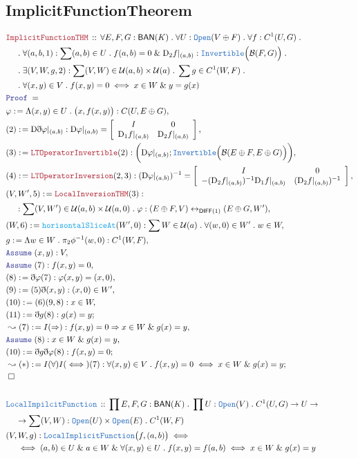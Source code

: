 \documentclass[12pt]{scrartcl}
\newcommand{\TYPE}[1]{\textcolor{NavyBlue}{\mathtt{#1}}}
\newcommand{\FUNC}[1]{\textcolor{Cerulean}{\mathtt{#1}}}
\newcommand{\LOGIC}[1]{\textcolor{Blue}{\mathtt{#1}}}
\newcommand{\THM}[1]{\textcolor{Maroon}{\mathtt{#1}}}
\renewcommand{\.}{\; . \;}
\newcommand{\de}{: \kern 0.1pc =}
\newcommand{\Theorem}[2]{& \THM{#1} \, :: \, #2 \\ & \Proof = \\ }
\newcommand{\DeclareType}[2]{& \TYPE{#1} \, :: \, #2 \\}
\newcommand{\NewLine}{\\ & \kern 1pc}
\newcommand{\Page}[1]{\begin{align*} #1 \end{align*}   }
\newcommand{ \bd }{ \ByDef }
\renewcommand{\And}{\; \& \;}
\newcommand{\ToBij}{\leftrightarrow}
\newcommand{\Say}[3]{& #1 \de #2 : #3, \\}
\newcommand{\Conclude}[3]{& #1 \de #2 : #3; \\}
\newcommand{\Derive}[3]{& \leadsto #1 \de #2 : #3, \\}
\newcommand{\DeriveConclude}[3]{& \leadsto #1 \de #2 : #3 ; \\}
\newcommand{\A}{\LOGIC{Assume} \;}
\newcommand{\Assume}[2]{& \A #1 : #2, \\}
\newcommand{\QED}{\; \square}
\newcommand{\EndProof}{& \QED \\}
\newcommand{\ByDef}{\eth}
\newcommand{\Proof}{\LOGIC{Proof} \; }
\newcommand{\DIFF}{\mathsf{DIFF}}
\newcommand{\BAN}{\mathsf{BAN}} %
\newcommand{\D}{\mathrm{D}}
\newcommand{\B}{\mathcal{B}}
\begin{document}
\subsection{ImplicitFunctionTheorem}
\Page{
	\Theorem{ImplicitFunctionTHM}{ 
		\forall E,F,G : \BAN(K) \.  \forall  U : \TYPE{Open}(V \oplus F) \. \forall f : C^1(U,G) \.
		\NewLine \.
		\forall (a,b,1) : \sum (a,b) \in U \. f(a,b) = 0 \And \D_2 f |_{(a,b)} : \TYPE{Invertible}\Big( \B(F,G) \Big)
		\. \NewLine \. 
		\exists (V,W,g,2) : \sum  (V,W) \in \mathcal{U}(a,b) \times  \mathcal{U}(a) \. \sum  g \in C^1(W,F) \. 
		\NewLine \.
		\forall (x,y) \in V \. f(x,y) = 0 \iff x \in W \And y = g(x)  
	}
	\Say{\varphi}{\Lambda (x,y) \in U \. \big(x,f(x,y)\big)}{  C(U,  E \oplus G )  }
	\Say{(2)}{\D \bd  \varphi |_{(a,b)}}{ \D \varphi |_{(a,b)} = 
		\left[ \begin{array}{cc}
			 I & 0 \\
			 \D_1 f |_{(a,b)} & \D_2 f |_{(a,b)} 
		       \end{array}
		\right]  }
       \Say{(3)}{\THM{LTOperatorInvertible}(2 )}{\bigg(\D \varphi |_{(a,b)} ; \TYPE{Invertible}\Big( \B( E \oplus F, E \oplus G ) \Big)\bigg)}
       \Say{(4)}{\THM{LTOperatorInversion}(2,3) }{ ( \D \varphi |_{(a,b)}    )^{-1} =   
		\left[ \begin{array}{cc}
				I & 0 \\
				-(\D_2 f |_{(a,b)})^{-1}\D_1 f |_{(a,b)} & (\D_2 f |_{(a,b)})^{-1} \\
		\end{array} \right]
       }
       \Say{(V,W',5)}{\THM{LocalInversionTHM}(3)}{ 
       		\NewLine :
       		\sum (V,W') \in \mathcal{U}(a,b) \times  \mathcal{U}(a,0)  \. \varphi : (E \oplus F, V) \ToBij_{\DIFF(1)} (E \oplus G,W') 
       }
       	\Say{(W,6)}{\FUNC{horisontalSliceAt}(W',0)}{\sum W \in \mathcal{U}(a) \. \forall (w,0) \in W' \. w \in W}
       	\Say{ g}{ \Lambda w \in W \.  \pi_2 \phi^{-1}(w,0)  }{ C^1(W,F)}
       	\Assume{(x,y)}{ V }
       	\Assume{(7)}{f(x,y) = 0}
       	\Say{(8)}{\bd \varphi(7)}{\varphi(x,y) = (x,0)}
       	\Say{(9)}{ (5)\bd(x,y)  }{(x,0) \in W'}
       	\Say{(10)}{ (6)(9,8)  }{x \in W}
       	\Conclude{(11)}{ \bd g(8)  }{ g(x) = y }
	\Derive{(7)}{I(\Rightarrow)}{ f(x,y) = 0 \Rightarrow x \in W \And g(x) = y }
	\Assume{(8)}{x \in W \And g(x) = y}
	\Conclude{(10)}{\bd g \bd \varphi (8)}{f(x,y) = 0}
	\DeriveConclude{(*)}{ I(\forall)I(\iff)(7) }{\forall (x,y) \in V \. f(x,y) = 0 \iff x \in W \And g(x) = y}
	\EndProof
	\\
	\DeclareType{LocalImpilcitFunction}{\prod E,F,G : \BAN(K) \. \prod U : \TYPE{Open}(V) \. C^1(U,G) \to U \to 
	\NewLine \to
	\sum (V,W) : \TYPE{Open}(U) \times \TYPE{Open}(E) \. C^1(W,F) }
	& (V,W,g) : \TYPE{LocalImplicitFunction}\big(f,(a,b)\big) \iff  \NewLine \iff (a,b) \in U \And a \in W \And \forall (x,y) \in U \. f(x,y) = f(a,b) \iff x \in W \And g(x) = y \\
}
\end{document}
